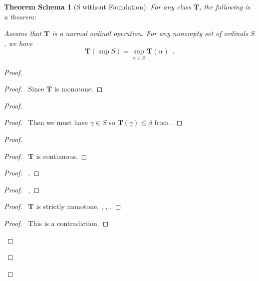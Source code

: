 \documentclass{book}
\let\qed\relax
\newtheorem{thms}[ax]{Theorem Schema}
\theoremstyle{definition}
\begin{document}
\begin{thms}[S without Foundation]
\label{thm:normalsup}
For any class $\mathbf{T}$, the following is a theorem:

Assume that $\mathbf{T}$ is a normal ordinal operation. For any nonempty set of ordinals $S$, we have
\[ \mathbf{T}(\sup S) = \sup_{\alpha \in S} \mathbf{T}(\alpha) \enspace . \]
\end{thms}

\begin{proof}
\pf
{}
\begin{proof}
	\pf\ Since $\mathbf{T}$ is monotone.
\end{proof}
\begin{proof}
	\begin{proof}
		\pf\ Then we must have $\gamma \in S$ so $\mathbf{T}(\gamma) \leq \beta$ from .
	\end{proof}
	\begin{proof}
		\begin{proof}
			\pf\ $\mathbf{T}$ is continuous.
		\end{proof}
		\begin{proof}
			\pf\ , 
		\end{proof}
		\begin{proof}
			\pf\ , 
		\end{proof}
		\begin{proof}
			\pf\ $\mathbf{T}$ is strictly monotone, , , .
		\end{proof}
		\qedstep
		\begin{proof}
			\pf\ This is a contradiction.
		\end{proof}
	\end{proof}
\end{proof}
\qed
\end{proof}
\end{document}
